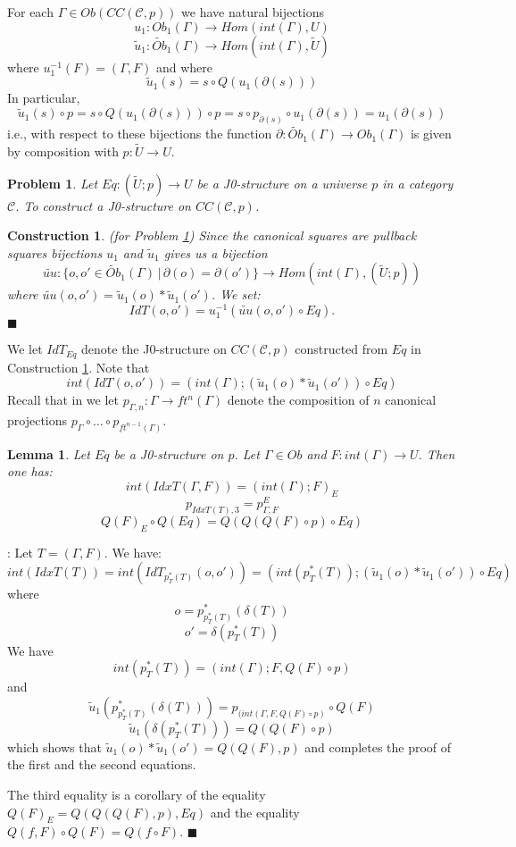 \documentclass[12pt]{article}
\numberwithin{equation}{section}
\newenvironment{eq}{\begin{equation}}{\end{equation}}
\newenvironment{myproof}{{\bf Proof}:}{$\blacksquare$ \vskip 5mm }
\newtheorem{lemma}[proposition]{Lemma}
\newtheorem{problem}[proposition]{Problem}
\newtheorem{construction0}[proposition]{Construction}
\newenvironment{construction}[1]{\begin{construction0}(for Problem \ref{#1})}{$\blacksquare$ \end{construction0}}
\newcommand{\llabel}[1]{\label{#1}}
\newcommand{\sr}{\rightarrow}
\newcommand{\wt}{\widetilde}
\newcommand{\toCC}{CC} %
\begin{document}
For each $\Gamma\in Ob(\toCC({\mathcal C},p))$ we have natural bijections
%
\begin{eq}
\llabel{2015.03.27.eq7b} u_1:Ob_1(\Gamma)\sr Hom(int(\Gamma),U)
\end{eq}
%
\begin{eq}
\llabel{2015.03.27.eq7a} \wt{u}_1:\wt{Ob}_1(\Gamma)\sr Hom(int(\Gamma),\wt{U})
\end{eq}
%
where $u_1^{-1}(F)=(\Gamma,F)$ and where
%
\begin{eq}
\llabel{2015.03.31.eq5} \wt{u}_1(s)=s\circ Q(u_1(\partial(s)))
\end{eq}
%
In particular,
%
$$\wt{u}_1(s)\circ p=s\circ Q(u_1(\partial(s)))\circ p=s\circ
p_{\partial(s)}\circ u_1(\partial(s))=u_1(\partial(s))$$
%
i.e., with respect to these bijections the function
$\partial:\wt{Ob}_1(\Gamma)\sr Ob_1(\Gamma)$ is given by composition with
$p:\wt{U}\sr U$.
%
\begin{problem}
\llabel{2015.03.27.prob3} Let $Eq:(\wt{U};p)\sr U$ be a J0-structure on a
universe $p$ in a category $\mathcal C$. To construct a J0-structure on
$\toCC({\mathcal C},p)$.
\end{problem}
%
\begin{construction}{2015.03.27.prob3}\rm
\llabel{2015.03.27.constr3} Since the canonical squares are pullback squares
bijections $u_1$ and $\wt{u}_1$ gives us a bijection
%
$$\wt{uu}:\{o,o'\in\wt{Ob}_1(\Gamma)\,|\,\partial(o)=\partial(o')\} \sr
Hom(int(\Gamma),(\wt{U};p))$$
%
where $\wt{uu}(o,o')=\wt{u}_1(o)*\wt{u}_1(o')$. We set:
%
$$IdT(o,o')=u_1^{-1}(\wt{uu}(o,o')\circ Eq).$$
%
\end{construction}
%
We let $IdT_{Eq}$ denote the J0-structure on $\toCC({\mathcal C},p)$ constructed
from $Eq$ in Construction \ref{2015.03.27.constr3}. Note that
%
\begin{eq}
\llabel{2015.03.31.eq1}
int(IdT(o,o'))=(int(\Gamma);(\wt{u}_1(o)*\wt{u}_1(o'))\circ Eq)
\end{eq}
%
Recall that in \cite{Csubsystems} we let $p_{\Gamma,n}:\Gamma\sr ft^n(\Gamma)$
denote the composition of $n$ canonical projections $p_{\Gamma}\circ \dots\circ
p_{ft^{n-1}(\Gamma)}$.
%
\begin{lemma}
\llabel{2015.03.27.l1} Let $Eq$ be a J0-structure on $p$. Let $\Gamma\in Ob$
and $F:int(\Gamma)\sr U$. Then one has:
%
$$int(IdxT(\Gamma,F))=(int(\Gamma);F)_{E}$$
$$p_{IdxT(T),3} = p^E_{\Gamma,F}$$
$$Q(F)_{E}\circ Q(Eq)=Q(Q(Q(F)\circ p)\circ Eq)$$
%
%
\end{lemma}
%
\begin{myproof}
Let $T=(\Gamma,F)$. We have:
%
$$int(IdxT(T))=int(IdT_{p_T^*(T)}(o,o'))=(int(p_T^*(T));(\wt{u}_1(o)*\wt{u}_1(o'))\circ
Eq)$$
%
where
%
$$o=p_{p_T^*(T)}^*(\delta(T))$$
$$o'=\delta(p_T^*(T))$$
%
We have
%
$$int(p_T^*(T))=(int(\Gamma);F,Q(F)\circ p)$$
%
and
%
$$\wt{u}_1(p_{p_T^*(T)}^*(\delta(T)))=p_{(int(\Gamma,F, Q(F)\circ p)}\circ
Q(F)$$
$$\wt{u}_1(\delta(p_T^*(T)))=Q(Q(F)\circ p)$$
%
which shows that $\wt{u}_1(o)*\wt{u}_1(o')=Q(Q(F),p)$ and completes the proof
of the first and the second equations.

The third equality is a corollary of the equality $Q(F)_{E}=Q(Q(Q(F),p),Eq)$
and the equality $Q(f,F)\circ Q(F)=Q(f\circ F)$.
\end{myproof}
\end{document}
